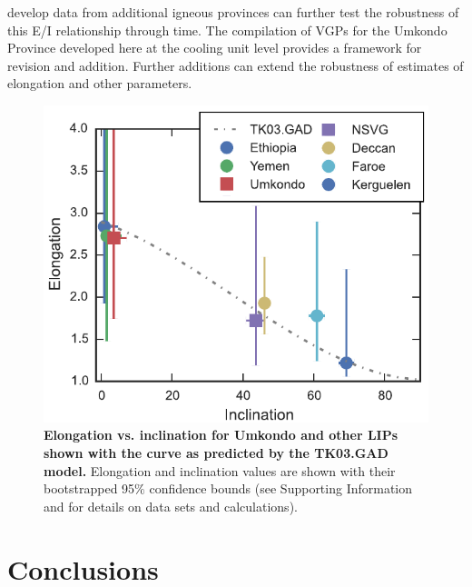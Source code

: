 \documentclass[11pt,letterpaper]{article}
\begin{document}
develop data from additional igneous provinces can further test the robustness of this E/I relationship through time. The compilation of VGPs for the Umkondo Province developed here at the cooling unit level provides a framework for revision and addition. Further additions can extend the robustness of estimates of elongation and other parameters.

\begin{figure}[h!]
\includegraphics[width=9 cm]{figures/EI_revised.pdf}
\caption{\textbf{ Elongation vs. inclination for Umkondo and other LIPs shown with the curve as predicted by the TK03.GAD model.} Elongation and inclination values are shown with their bootstrapped 95$\%$ confidence bounds (see Supporting Information and \cite{Tauxe2008a} for details on data sets and calculations).}
\label{fig:EI}
\end{figure}

\section*{Conclusions}
\end{document}
